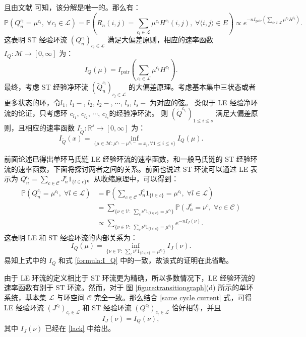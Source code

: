 且由文献 \cite{kalpazidou2007cycle}可知，该分解是唯一的。那么有：
\begin{equation*}
    \mathbb{P}(Q_n^{c_l}=\mu^{c_l},\;\forall c_l\in\mathcal{L})
    =\mathbb{P}\left(R_n(i,j)=\sum_{c_l\in\mathcal{L}}\mu^{c_l}H^{c_l}(i,j),\;\forall\langle i,j\rangle\in E\right)
    \propto e^{-n I_{\mathrm{pair}}\left(\sum_{c_l\in\mathcal{L}}\mu^{c_l}H^{c_l}\right)}.
\end{equation*}
这表明 ST 经验环流 $(Q_n^{c_l})_{c_l\in\mathcal{L}}$ 满足大偏差原则，相应的速率函数 $I_Q:\mathcal{M}\rightarrow[0,\infty]$ 为：
\begin{equation}\label{formula:I_Q}
I_Q(\mu)=I_{\mathrm{pair}}\left(\sum_{c_l\in\mathcal{L}}\mu^{c_l}H^{c_l}\right).
\end{equation}
最终，考虑 ST 经验净环流 $(\tilde{Q}^{c_l}_n)_{c_l\in\mathcal{L}}$ 的大偏差原理。考虑基本集中三状态或者更多状态的环，令$l_1$, $l_1-$, $l_2$, $l_2-$, $\cdots$, $l_s$, $l_s-$ 为对应的弦。 类似于 LE 经验净环流的论证，只考虑环 $c_{l_1}$, $c_{l_2}$, $\cdots$, $c_{l_s}$的经验净环流。 则 $(\tilde{Q}^{c_{l_i}})_{1\le i\le s}$ 满足大偏差原则，且相应的速率函数 $I_{\tilde{Q}}:\mathbb{R}^s\rightarrow[0,\infty]$ 为：
\begin{equation}\label{I_Q2}
	I_{\tilde{Q}}(x)=\inf_{\{\mu\in\mathcal{M}:\mu^{c_{l_{i}}}-\mu^{c_{l_{i}}-}= x_i,\forall 1\le i\le s\}}I_Q(\mu).
\end{equation}

前面论述已得出单环马氏链 LE 经验环流的速率函数，和一般马氏链的 ST 经验环流的速率函数，下面将探讨两者之间的关系。前面也说过 ST 环流可以通过 LE 表示为 $Q_n^{c_l} = \sum_{c\in\mathcal{C}}J^c_n1_{\{l\in c\}}$。从收缩原理中，可以得到：
\begin{align*}
	\mathbb{P}\left(Q_n^{c_l}=\mu^{c_l},\;\forall l\in\mathcal{L}\right)
	&= \mathbb{P}\left(\sum_{c\in\mathcal{C}}J^c_n1_{\{l\in c\}}=\mu^{c_l},\;\forall l\in\mathcal{L}\right)\\
	&= \sum_{\{\nu\in\mathcal{V}:\;\sum_c\nu^c1_{\{l\in c\}}=\mu^{c_l}\}}
	\mathbb{P}\left(J^c_n=\nu^c,\;\forall c\in\mathcal{C}\right)\\
	&\propto \sum_{\{\nu\in\mathcal{V}:\;\sum_c\nu^c1_{\{l\in c\}}=\mu^{c_l}\}}e^{-nI_J(\nu)}.
\end{align*}
这表明 LE 和 ST 经验环流的内部关系为：
\begin{equation*}
	I_Q(\mu) = \inf_{\{\nu\in\mathcal{V}:\;\sum_c\nu^c1_{\{l\in c\}}=\mu^{c_l}\}}I_J(\nu).
\end{equation*}
易知上式中的 $I_Q$ 和式 \eqref{formula:I_Q} 中的一致，故该式的证明在此省略。

由于 LE 环流的定义相比于 ST 环流更为精确，所以多数情况下，LE 经验环流的速率函数有别于 ST 环流。然而，对于 图 \ref{figure:transitiongraph}(d) 所示的单环系统，基本集 $\mathcal{L}$ 与环空间 $\mathcal{C}$ 完全一致。那么结合 \eqref{same cycle current} 式，可得 LE 经验环流 $(J^{c_l})_{c_l\in\mathcal{L}}$ 和 ST 经验环流 $(Q^{c_l})_{c_l\in\mathcal{L}}$ 恰好相等，并且 
\begin{equation*}
	I_J(\nu) = I_Q(\nu),
\end{equation*}
其中 $I_J(\nu)$ 已经在 \eqref{lack} 中给出。